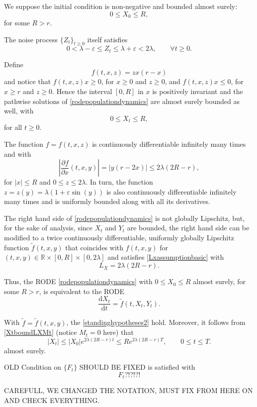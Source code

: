 \documentclass[reqno,12pt]{amsart}
\theoremstyle{plain}%
\theoremstyle{definition}
\begin{document}
We suppose the initial condition is non-negative and bounded almost surely:
\[
    0 \leq X_0 \leq R,
\]
for some $R > r$.

The noise process $\{Z_t\}_{t \geq 0}$ itself satisfies
\[
    0 < \lambda - \varepsilon \leq Z_t \leq \lambda + \varepsilon < 2\lambda, \qquad \forall t \geq 0.
\]

Define 
\[
    f(t, x, z) = z x(r - x)
\]
and notice that $f(t, x, z)x \geq 0$, for $x \geq 0$ and $z \geq 0$, and $f(t, x, z)x \leq 0$, for $x \geq r$ and $z \geq 0$. Hence the interval $[0, R]$ in $x$ is positively invariant and the pathwise solutions of \eqref{rodepopulationdynamics} are almost surely bounded as well, with
\[
    0 \leq X_t \leq R,
\]
for all $t \geq 0$.

The function $f=f(t, x, z)$ is continuously differentiable infinitely many times and with
\[
    \left|\frac{\partial f}{\partial x}(t, x, y)\right| = |y(r - 2x)|\leq 2\lambda (2R - r),
\]
for $|x| \leq R$ and $0 \leq z \leq 2\lambda$. In turn, the function $z = z(y) = \lambda (1 + \varepsilon \sin(y))$ is also continuously differentiable infinitely many times and is uniformly bounded along with all its derivatives.

The right hand side of \eqref{rodepopulationdynamics} is not globally Lipschitz, but, for the sake of analysis, since $X_t$ and $Y_t$ are bounded, the right hand side can be modified to a twice continuously differentiable, uniformly globally Lipschitz function $\tilde f(t, x, y)$ that coincides with $f(t, x, y)$ for $(t, x, y) \in \mathbb{R}\times [0, R]\times [0, 2\lambda]$ and satisfies \eqref{Lxassumptionbasic} with
\[
    L_X = 2\lambda (2R - r).
\]

Thus, the RODE \eqref{rodepopulationdynamics} with $0\leq X_0 \leq R$ almost surely, for some $R > r$, is equivalent to the RODE
\begin{equation}
    \label{rodepopulationdynamicstruncated}
    \frac{\mathrm{d}X_t}{\mathrm{d}t} = \tilde f(t, X_t, Y_t).
\end{equation}

With $\tilde f=\tilde f(t, x, y)$, the \cref{standinghypotheses2} hold. Moreover, it follows from \eqref{XtboundLXMt} (notice $M_t = 0$ here) that
\[
    |X_t| \leq |X_0|e^{2\lambda (2R - r)t} \leq R e^{2\lambda (2R - r)T}, \qquad 0 \leq t \leq T.
\]
almost surely. 

OLD Condition on $\{F_t\}$ SHOULD BE FIXED is satisfied with
\[
    F_t ?!?!?!
\]

CAREFULL, WE CHANGED THE NOTATION, MUST FIX FROM HERE ON AND CHECK EVERYTHING.
\end{document}
